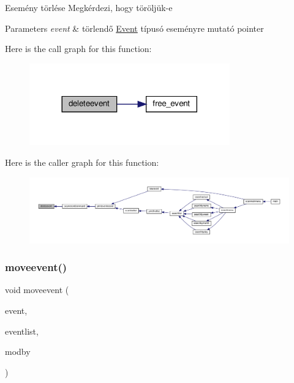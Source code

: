 Esemény törlése Megkérdezi, hogy töröljük-\/e 
\begin{DoxyParams}{Parameters}
{\em event} & törlendő \hyperlink{struct_event}{Event} típusó eseményre mutató pointer \\
\hline
\end{DoxyParams}
Here is the call graph for this function\+:
\nopagebreak
\begin{figure}[H]
\begin{center}
\leavevmode
\includegraphics[width=245pt]{group__eventrecord_gaf69a5ee77b139263897d5e6bfe7d7f2a_cgraph}
\end{center}
\end{figure}
Here is the caller graph for this function\+:
\nopagebreak
\begin{figure}[H]
\begin{center}
\leavevmode
\includegraphics[width=350pt]{group__eventrecord_gaf69a5ee77b139263897d5e6bfe7d7f2a_icgraph}
\end{center}
\end{figure}
\mbox{\label{group__eventrecord_ga610dc34a1e251a16311ca7ac15f64e05}} 
\subsubsection{\texorpdfstring{moveevent()}{moveevent()}}
{\footnotesize\ttfamily void moveevent (\begin{DoxyParamCaption}\item[{\hyperlink{struct_event}{Event} $\ast$}]{event,  }\item[{\hyperlink{struct_event_list}{Event\+List} const $\ast$}]{eventlist,  }\item[{\hyperlink{group__eventrecord_ga643f8b09cbc45afc4ad36b27c077b1fd}{Mod\+By}}]{modby }\end{DoxyParamCaption})}


